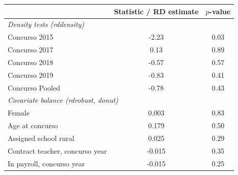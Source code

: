 \begin{tabular}{lcc}
\toprule
 & Statistic / RD estimate & $p$-value \\
\midrule
\multicolumn{3}{l}{\emph{Density tests (rddensity)}} \\
\quad Concurso 2015 & -2.23 & 0.03 \\
\quad Concurso 2017 & 0.13 & 0.89 \\
\quad Concurso 2018 & -0.57 & 0.57 \\
\quad Concurso 2019 & -0.83 & 0.41 \\
\quad Concurso Pooled & -0.78 & 0.43 \\
\midrule
\multicolumn{3}{l}{\emph{Covariate balance (rdrobust, donut)}} \\
\quad Female & 0.003 & 0.83 \\
\quad Age at concurso & 0.179 & 0.50 \\
\quad Assigned school rural & 0.025 & 0.29 \\
\quad Contract teacher, concurso year & -0.015 & 0.35 \\
\quad In payroll, concurso year & -0.015 & 0.25 \\
\bottomrule
\end{tabular}
